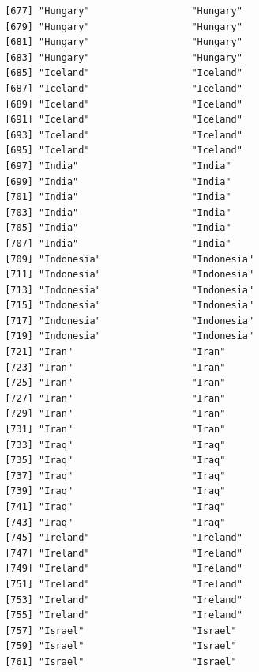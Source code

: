 \documentclass[
  letterpaper,
  DIV=11,
  numbers=noendperiod]{scrreprt}
\begin{document}
\begin{verbatim}
 [677] "Hungary"                  "Hungary"                 
 [679] "Hungary"                  "Hungary"                 
 [681] "Hungary"                  "Hungary"                 
 [683] "Hungary"                  "Hungary"                 
 [685] "Iceland"                  "Iceland"                 
 [687] "Iceland"                  "Iceland"                 
 [689] "Iceland"                  "Iceland"                 
 [691] "Iceland"                  "Iceland"                 
 [693] "Iceland"                  "Iceland"                 
 [695] "Iceland"                  "Iceland"                 
 [697] "India"                    "India"                   
 [699] "India"                    "India"                   
 [701] "India"                    "India"                   
 [703] "India"                    "India"                   
 [705] "India"                    "India"                   
 [707] "India"                    "India"                   
 [709] "Indonesia"                "Indonesia"               
 [711] "Indonesia"                "Indonesia"               
 [713] "Indonesia"                "Indonesia"               
 [715] "Indonesia"                "Indonesia"               
 [717] "Indonesia"                "Indonesia"               
 [719] "Indonesia"                "Indonesia"               
 [721] "Iran"                     "Iran"                    
 [723] "Iran"                     "Iran"                    
 [725] "Iran"                     "Iran"                    
 [727] "Iran"                     "Iran"                    
 [729] "Iran"                     "Iran"                    
 [731] "Iran"                     "Iran"                    
 [733] "Iraq"                     "Iraq"                    
 [735] "Iraq"                     "Iraq"                    
 [737] "Iraq"                     "Iraq"                    
 [739] "Iraq"                     "Iraq"                    
 [741] "Iraq"                     "Iraq"                    
 [743] "Iraq"                     "Iraq"                    
 [745] "Ireland"                  "Ireland"                 
 [747] "Ireland"                  "Ireland"                 
 [749] "Ireland"                  "Ireland"                 
 [751] "Ireland"                  "Ireland"                 
 [753] "Ireland"                  "Ireland"                 
 [755] "Ireland"                  "Ireland"                 
 [757] "Israel"                   "Israel"                  
 [759] "Israel"                   "Israel"                  
 [761] "Israel"                   "Israel"                  

\end{verbatim}
\end{document}
